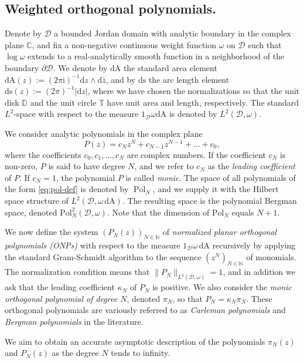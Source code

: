\documentclass{amsart}
\newcommand{\be}{\begin{equation}}
\newcommand{\ee}{\end{equation}}
\newcommand{\C}{\mathbb{C}}
\newcommand{\D}{\mathbb{D}}
\newcommand{\T}{\mathbb{T}}
\newcommand{\N}{\mathbb{N}}
\newcommand{\calD}{\mathcal{D}}
\newcommand{\diffA}{\mathrm{dA}}
\newcommand{\diffs}{\mathrm{ds}}
\newcommand{\diff}{\mathrm{d}}
\theoremstyle{definition}
\theoremstyle{remark}
\newcommand{\imag}{\mathrm{i}}
\numberwithin{equation}{subsection}
\begin{document}
\subsection{Weighted orthogonal polynomials.}
Denote by $\calD$ a bounded Jordan domain with analytic boundary
in the complex plane $\C$, 
and fix a non-negative continuous weight function $\omega$ on $\calD$ 
such that $\log \omega$ extends to a real-analytically smooth
function in a neighborhood of the boundary $\partial\calD$. 
We denote by $\diffA$ the standard area element
$\diffA(z):=(2\pi\imag)^{-1}\diff z\wedge\diff\bar z$, and by $\diffs$
the arc length element $\diffs(z):=(2\pi)^{-1}|\diff z|$,
where we have chosen the normalizations 
so that the unit disk $\D$ and the unit circle $\T$ 
have unit area and length, respectively. The standard $L^2$-space
with respect to the measure $1_\calD\omega\diffA$ is denoted by
$L^2(\calD,\omega)$.




We consider analytic polynomials in the complex plane 
\be\label{eq:pol-def}
P(z)=c_N z^N + c_{N-1} z^{N-1} + \ldots + c_0,
\ee
where the coefficients $c_0, c_1,\ldots, c_N$ are complex numbers. 
If the coefficient $c_N$ is non-zero, $P$ is said 
to have degree $N$, and we refer to $c_N$ as the 
{\em leading coefficient} of $P$. If $c_N=1$,
the polynomial $P$ is called {\em monic}.
The space of all
polynomials of the form \eqref{eq:pol-def} is denoted by 
$\operatorname{Pol}_{N}$, and we supply it with the Hilbert space structure
of $L^2(\calD,\omega\,\diffA)$. The resulting space is the
polynomial Bergman space, denoted $\mathrm{Pol}^2_{N}(\calD,\omega)$.
Note that the dimension of $\mathrm{Pol}_N$ equals $N+1$.

We now define the system $(P_{N}(z))_{N\in\N}$ 
of {\em normalized planar orthogonal polynomials (ONPs)}
with respect to the measure $1_\calD\omega\,\diffA$ 
recursively by applying the standard Gram-Schmidt algorithm 
to the sequence $(z^N)_{N\in\N}$ of monomials. The normalization
condition means that $\lVert P_N\rVert_{L^2(\calD,\omega)}=1$,
and in addition we ask that the leading coefficient $\kappa_N$
of $P_N$ is positive. We also consider the 
{\em monic orthogonal polynomial of degree $N$}, denoted $\pi_N$, 
so that $P_N=\kappa_N\pi_N$.
These orthogonal polynomials are variously referred to as
{\em Carleman polynomials} and {\em Bergman polynomials} in 
the literature.


We aim to obtain an accurate asymptotic description of
the polynomials $\pi_N(z)$ and $P_N(z)$ as the degree $N$ tends to infinity.
\end{document}
